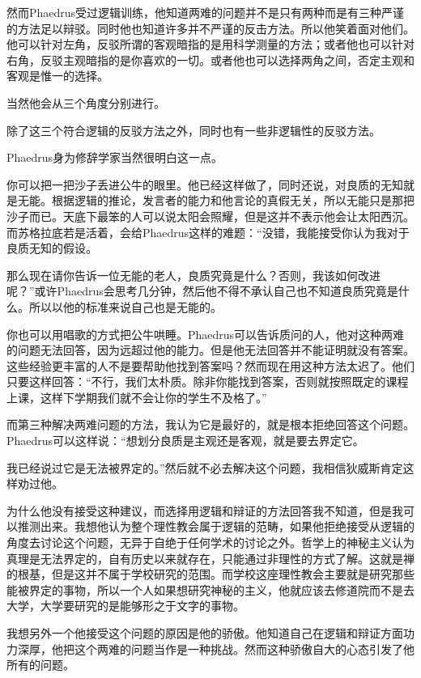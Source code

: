 \documentclass[UTF8]{article}
\begin{document}
\par 然而Phaedrus受过逻辑训练，他知道两难的问题并不是只有两种而是有三种严谨的方法足以辩驳。同时他也知道许多并不严谨的反击方法。所以他笑着面对他们。他可以针对左角，反驳所谓的客观暗指的是用科学测量的方法；或者他也可以针对右角，反驳主观暗指的是你喜欢的一切。或者他也可以选择两角之间，否定主观和客观是惟一的选择。
\par 当然他会从三个角度分别进行。
\par 除了这三个符合逻辑的反驳方法之外，同时也有一些非逻辑性的反驳方法。
\par Phaedrus身为修辞学家当然很明白这一点。
\par 你可以把一把沙子丢进公牛的眼里。他已经这样做了，同时还说，对良质的无知就是无能。根据逻辑的推论，发言者的能力和他言论的真假无关，所以无能只是那把沙子而已。天底下最笨的人可以说太阳会照耀，但是这并不表示他会让太阳西沉。而苏格拉底若是活着，会给Phaedrus这样的难题：“没错，我能接受你认为我对于良质无知的假设。
\par 那么现在请你告诉一位无能的老人，良质究竟是什么？否则，我该如何改进呢？”或许Phaedrus会思考几分钟，然后他不得不承认自己也不知道良质究竟是什么。所以以他的标准来说自己也是无能的。
\par 你也可以用唱歌的方式把公牛哄睡。Phaedrus可以告诉质问的人，他对这种两难的问题无法回答，因为远超过他的能力。但是他无法回答并不能证明就没有答案。这些经验更丰富的人不是要帮助他找到答案吗？然而现在用这种方法太迟了。他们只要这样回答：“不行，我们太朴质。除非你能找到答案，否则就按照既定的课程上课，这样下学期我们就不会让你的学生不及格了。”
\par 而第三种解决两难问题的方法，我认为它是最好的，就是根本拒绝回答这个问题。Phaedrus可以这样说：“想划分良质是主观还是客观，就是要去界定它。
\par 我已经说过它是无法被界定的。”然后就不必去解决这个问题，我相信狄威斯肯定这样劝过他。
\par 为什么他没有接受这种建议，而选择用逻辑和辩证的方法回答我不知道，但是我可以推测出来。我想他认为整个理性教会属于逻辑的范畴，如果他拒绝接受从逻辑的角度去讨论这个问题，无异于自绝于任何学术的讨论之外。哲学上的神秘主义认为真理是无法界定的，自有历史以来就存在，只能通过非理性的方式了解。这就是禅的根基，但是这并不属于学校研究的范围。而学校这座理性教会主要就是研究那些能被界定的事物，所以一个人如果想研究神秘的主义，他就应该去修道院而不是去大学，大学要研究的是能够形之于文字的事物。
\par 我想另外一个他接受这个问题的原因是他的骄傲。他知道自己在逻辑和辩证方面功力深厚，他把这个两难的问题当作是一种挑战。然而这种骄傲自大的心态引发了他所有的问题。
\end{document}
